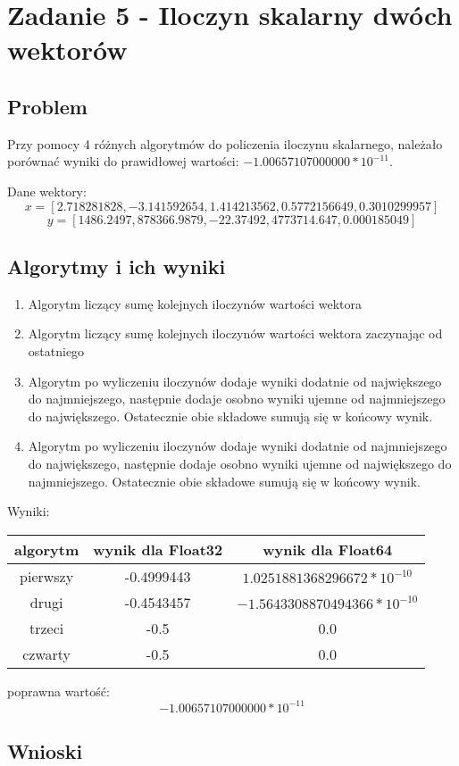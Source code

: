 \documentclass[12pt, a4paper]{article}
\begin{document}
\section{Zadanie 5 - Iloczyn skalarny dwóch wektorów}
\subsection{Problem}
Przy pomocy 4 różnych algorytmów do policzenia iloczynu skalarnego, należało porównać wyniki do prawidłowej wartości: $ -1.00657107000000 * 10^{-11}$.

Dane wektory:
\[x = [2.718281828, -3.141592654, 1.414213562, 0.5772156649, 0.3010299957]\]
\[y = [1486.2497, 878366.9879, -22.37492, 4773714.647, 0.000185049]\]
\subsection{Algorytmy i ich wyniki}
\begin{enumerate}
  \item Algorytm liczący sumę kolejnych iloczynów wartości wektora
  \item Algorytm liczący sumę kolejnych iloczynów wartości wektora zaczynając od ostatniego
  \item Algorytm po wyliczeniu iloczynów dodaje wyniki dodatnie od największego do najmniejszego, następnie dodaje osobno wyniki ujemne od najmniejszego do największego. Ostatecznie obie składowe sumują się w końcowy wynik.
  \item Algorytm po wyliczeniu iloczynów dodaje wyniki dodatnie od najmniejszego do największego, następnie dodaje osobno wyniki ujemne od największego do najmniejszego. Ostatecznie obie składowe sumują się w końcowy wynik.
\end{enumerate}
Wyniki:
\begin{center}
  \begin{tabular}{c|c|c}
    algorytm & wynik dla Float32 & wynik dla Float64\\
    \hline
    pierwszy & -0.4999443 & $1.0251881368296672 * 10^{-10}$\\
    drugi & -0.4543457 & $-1.5643308870494366 * 10^{-10}$\\
    trzeci & -0.5 & 0.0\\
    czwarty & -0.5 & 0.0
  \end{tabular}
\end{center}
poprawna wartość: \[-1.00657107000000 * 10^{-11}\]
\subsection{Wnioski}
\end{document}
